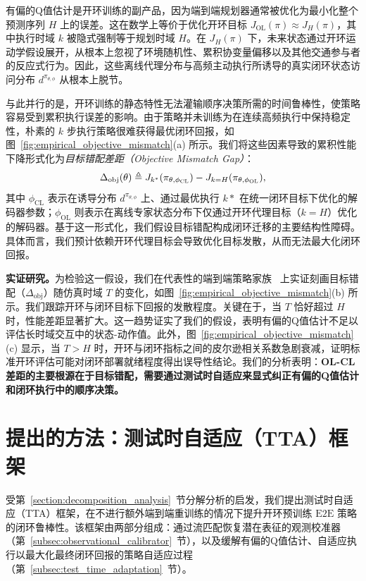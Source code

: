 \documentclass{article}
\begin{document}
有偏的Q值估计是开环训练的副产品，因为端到端规划器通常被优化为最小化整个预测序列 $H$ 上的误差。这在数学上等价于优化开环目标 $J_{\mathrm{OL}}(\pi) \approx J_H(\pi)$，其中执行时域 $k$ 被隐式强制等于规划时域 $H$。在 $J_H(\pi)$ 下，未来状态通过开环运动学假设展开，从根本上忽视了环境随机性、累积协变量偏移以及其他交通参与者的反应式行为。因此，这些离线代理分布与高频主动执行所诱导的真实闭环状态访问分布 $d^{\pi_{\theta, \phi}}$ 从根本上脱节。

与此并行的是，开环训练的静态特性无法灌输顺序决策所需的时间鲁棒性，使策略容易受到累积执行误差的影响。由于策略并未训练为在连续高频执行中保持稳定性，朴素的 $k$ 步执行策略很难获得最优闭环回报，如图~\ref{fig:empirical_objective_mismatch}(a) 所示。我们将这些因素导致的累积性能下降形式化为\emph{目标错配差距（Objective Mismatch Gap）}：
\begin{equation}
\small
    \Delta_{\mathrm{obj}}(\theta) \triangleq J_{k^*}(\pi_{\theta, \phi_{\mathrm{CL}}}) - J_{k=H}(\pi_{\theta, \phi_{\mathrm{OL}}}),
\end{equation}
其中 $\phi_{\mathrm{CL}}$ 表示在诱导分布 $d^{\pi_{\theta, \phi}}$ 上、通过最优执行 $k*$ 在统一闭环目标下优化的解码器参数；$\phi_{\mathrm{OL}}$ 则表示在离线专家状态分布下仅通过开环代理目标（$k=H$）优化的解码器。基于这一形式化，我们假设目标错配构成闭环迁移的主要结构性障碍。具体而言，我们预计依赖开环代理目标会导致优化目标发散，从而无法最大化闭环回报。

\textbf{实证研究。}为检验这一假设，我们在代表性的端到端策略家族~\cite{diffusiondrive, diffusiondrivev2, transfuser, RAP} 上实证刻画目标错配（$\Delta_{\mathrm{obj}}$）随仿真时域 $T$ 的变化，如图~\ref{fig:empirical_objective_mismatch}(b) 所示。我们跟踪开环与闭环目标下回报的发散程度。关键在于，当 $T$ 恰好超过 $H$ 时，性能差距显著扩大。这一趋势证实了我们的假设，表明有偏的Q值估计不足以评估长时域交互中的状态-动作值。此外，图~\ref{fig:empirical_objective_mismatch}(c) 显示，当 $T > H$ 时，开环与闭环指标之间的皮尔逊相关系数急剧衰减，证明标准开环评估可能对闭环部署就绪程度得出误导性结论。我们的分析表明：\textbf{OL-CL差距的主要根源在于目标错配，需要通过测试时自适应来显式纠正有偏的Q值估计和闭环执行中的顺序决策。}


\section{提出的方法：测试时自适应（TTA）框架}
\label{section:method}

受第~\ref{section:decomposition_analysis}~节分解分析的启发，我们提出测试时自适应（TTA）框架，在不进行额外端到端重训练的情况下提升开环预训练 $\text{E2E}$ 策略的闭环鲁棒性。该框架由两部分组成：通过流匹配恢复潜在表征的观测校准器（第~\ref{subsec:observational_calibrator}~节），以及缓解有偏的Q值估计、自适应执行以最大化最终闭环回报的策略自适应过程（第~\ref{subsec:test_time_adaptation}~节）。
\end{document}

